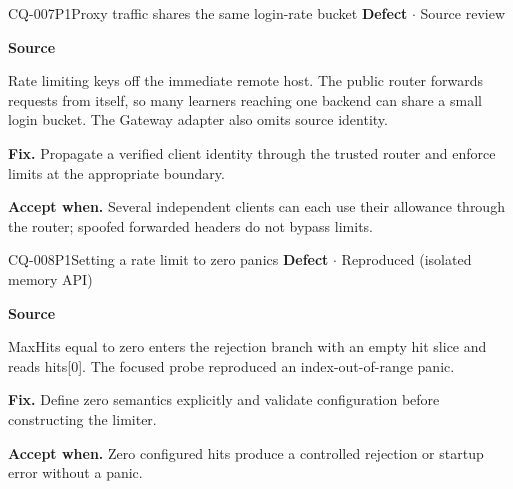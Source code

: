 \begin{finding}{CQ-007}{P1}{Proxy traffic shares the same login-rate bucket}
\textbf{Defect} $\cdot$ Source review\par
\textbf{Source}\quad{}\par
Rate limiting keys off the immediate remote host. The public router forwards requests from itself, so many learners reaching one backend can share a small login bucket. The Gateway adapter also omits source identity.\par
\textbf{Fix.} Propagate a verified client identity through the trusted router and enforce limits at the appropriate boundary.\par
\textbf{Accept when.} Several independent clients can each use their allowance through the router; spoofed forwarded headers do not bypass limits.
\end{finding}
\begin{finding}{CQ-008}{P1}{Setting a rate limit to zero panics}
\textbf{Defect} $\cdot$ Reproduced (isolated memory API)\par
\textbf{Source}\quad{}\par
MaxHits equal to zero enters the rejection branch with an empty hit slice and reads hits[0]. The focused probe reproduced an index-out-of-range panic.\par
\textbf{Fix.} Define zero semantics explicitly and validate configuration before constructing the limiter.\par
\textbf{Accept when.} Zero configured hits produce a controlled rejection or startup error without a panic.
\end{finding}
\clearpage
